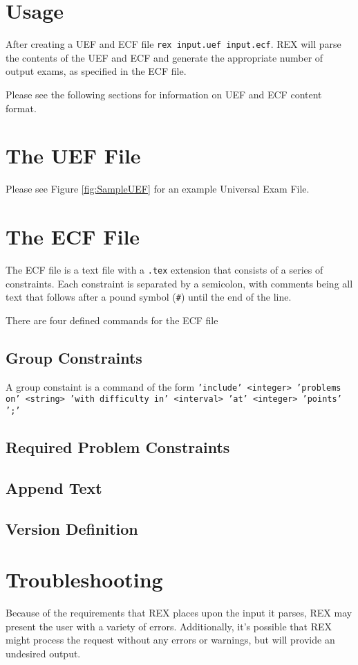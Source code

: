 \documentclass{article}
\begin{document}
\section{Usage}
After creating a UEF and ECF file \texttt{rex input.uef input.ecf}. 
REX will parse the contents of the UEF and ECF and generate the
appropriate number of output exams, as specified in the ECF file.

Please see the following sections for information on UEF and ECF
content format.

\section{The UEF File}

Please see Figure \ref{fig:SampleUEF} for an example Universal Exam File.

\section{The ECF File}
The ECF file is a text file with a \texttt{.tex} extension that consists
of a series of constraints. Each constraint is separated by a semicolon,
with comments being all text that follows after a pound symbol 
(\texttt{#}) until the end of the line.

There are four defined commands for the ECF file
\subsection{Group Constraints}
A group constaint is a command of the form \texttt{'include' <integer>
'problems on' <string> 'with difficulty in' <interval> 'at' <integer>
'points' ';'}

\subsection{Required Problem Constraints}

\subsection{Append Text}

\subsection{Version Definition
}

\section{Troubleshooting}
Because of the requirements that REX places upon the input it parses,
REX may present the user with a variety of errors. Additionally, it's
possible that REX might process the request without any errors or warnings,
but will provide an undesired output.
\end{document}
